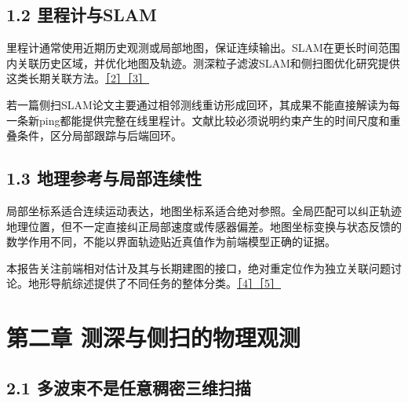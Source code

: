 \hypertarget{ux91ccux7a0bux8ba1ux4e0eslam}{%
\subsection{1.2 里程计与SLAM}\label{ux91ccux7a0bux8ba1ux4e0eslam}}

里程计通常使用近期历史观测或局部地图，保证连续输出。SLAM在更长时间范围内关联历史区域，并优化地图及轨迹。测深粒子滤波SLAM和侧扫图优化研究提供这类长期关联方法。\href{https://doi.org/10.1177/0278364912459666}{［2］}\href{https://arxiv.org/abs/2312.13802}{［3］}

若一篇侧扫SLAM论文主要通过相邻测线重访形成回环，其成果不能直接解读为每一条新ping都能提供完整在线里程计。文献比较必须说明约束产生的时间尺度和重叠条件，区分局部跟踪与后端回环。

\hypertarget{ux5730ux7406ux53c2ux8003ux4e0eux5c40ux90e8ux8fdeux7eedux6027}{%
\subsection{1.3 地理参考与局部连续性}\label{ux5730ux7406ux53c2ux8003ux4e0eux5c40ux90e8ux8fdeux7eedux6027}}

局部坐标系适合连续运动表达，地图坐标系适合绝对参照。全局匹配可以纠正轨迹地理位置，但不一定直接纠正局部速度或传感器偏差。地图坐标变换与状态反馈的数学作用不同，不能以界面轨迹贴近真值作为前端模型正确的证据。

本报告关注前端相对估计及其与长期建图的接口，绝对重定位作为独立关联问题讨论。地形导航综述提供了不同任务的整体分类。\href{https://eprints.soton.ac.uk/153897/1/Carreno_2010_-_A_survey__on_TBN_for_AUVs.pdf}{［4］}\href{https://doi.org/10.1016/j.oceaneng.2017.04.047}{［5］}

\hypertarget{ux7b2cux4e8cux7ae0-ux6d4bux6df1ux4e0eux4fa7ux626bux7684ux7269ux7406ux89c2ux6d4b}{%
\section{第二章 测深与侧扫的物理观测}\label{ux7b2cux4e8cux7ae0-ux6d4bux6df1ux4e0eux4fa7ux626bux7684ux7269ux7406ux89c2ux6d4b}}

\hypertarget{ux591aux6ce2ux675fux4e0dux662fux4efbux610fux7a20ux5bc6ux4e09ux7ef4ux626bux63cf}{%
\subsection{2.1 多波束不是任意稠密三维扫描}\label{ux591aux6ce2ux675fux4e0dux662fux4efbux610fux7a20ux5bc6ux4e09ux7ef4ux626bux63cf}}

